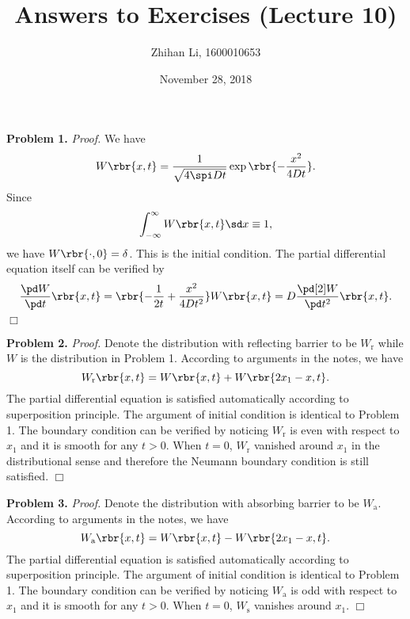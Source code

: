 \documentclass[english, nochinese]{pnote}
\title{Answers to Exercises (Lecture 10)}
\author{Zhihan Li, 1600010653}
\date{November 28, 2018}
\begin{document}
\maketitle

\textbf{Problem 1.} \textit{Proof.} We have
\begin{equation}
W \rbr{ x, t } = \frac{1}{\sqrt{ 4 \spi D t }} \exp \rbr{-\frac{ x^2 }{ 4 D t }}.
\end{equation}
Since
\begin{equation}
\int_{-\infty}^{\infty} W \rbr{ x, t } \sd x \equiv 1,
\end{equation}
we have $ W \rbr{ \cdot, 0 } = \delta $. This is the initial condition. The partial differential equation itself can be verified by
\begin{equation}
\frac{ \pd W }{ \pd t } \rbr{ x, t } = \rbr{ -\frac{1}{ 2 t } + \frac{x^2}{ 4 D t^2 } } W \rbr{ x, t } = D \frac{ \pd[2] W }{ \pd t^2 } \rbr{ x, t }.
\end{equation}
\hfill$\Box$

\textbf{Problem 2.} \textit{Proof.} Denote the distribution with reflecting barrier to be $W_{\text{r}}$ while $W$ is the distribution in Problem 1. According to arguments in the notes, we have
\begin{equation}
W_{\text{r}} \rbr{ x, t } = W \rbr{ x, t } + W \rbr{ 2 x_1 - x, t }.
\end{equation}
The partial differential equation is satisfied automatically according to superposition principle. The argument of initial condition is identical to Problem 1. The boundary condition can be verified by noticing $W_{\text{r}}$ is even with respect to $x_1$ and it is smooth for any $ t > 0 $. When $ t = 0 $, $W_{\text{r}}$ vanished around $x_1$ in the distributional sense and therefore the Neumann boundary condition is still satisfied.
\hfill$\Box$

\textbf{Problem 3.} \textit{Proof.} Denote the distribution with absorbing barrier to be $W_{\text{a}}$. According to arguments in the notes, we have
\begin{equation}
W_{\text{a}} \rbr{ x, t } = W \rbr{ x, t } - W \rbr{ 2 x_1 - x, t }.
\end{equation}
The partial differential equation is satisfied automatically according to superposition principle. The argument of initial condition is identical to Problem 1. The boundary condition can be verified by noticing $W_{\text{a}}$ is odd with respect to $x_1$ and it is smooth for any $ t > 0 $. When $ t = 0 $, $W_{\text{s}}$ vanishes around $x_1$.
\hfill$\Box$
\end{document}
